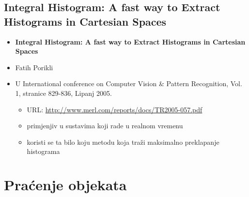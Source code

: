 \documentclass[times, utf8, seminar, numeric]{fer}
\begin{document}
\subsection{Integral Histogram: A fast way to Extract Histograms in Cartesian Spaces}
\begin{itemize}
\item \textbf{Integral Histogram: A fast way to Extract Histograms in Cartesian Spaces}
\item Fatih Porikli
\item U International conference on Computer Vision \& Pattern Recognition, Vol. 1, stranice 829-836, Lipanj 2005. 
	\begin{itemize}
		\item URL: \url{http://www.merl.com/reports/docs/TR2005-057.pdf}
		\item primjenjiv u sustavima koji rade u realnom vremenu
		\item koristi se ta bilo koju metodu koja traži maksimalno preklapanje histograma
	\end{itemize}
\end{itemize}

\section{Praćenje objekata}
\end{document}
